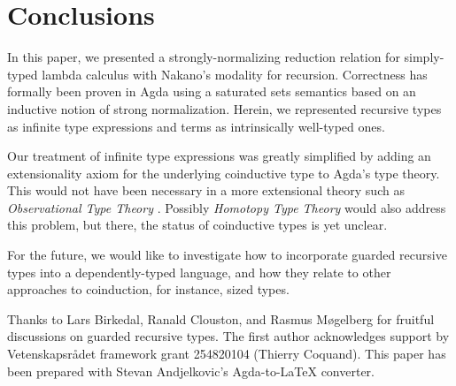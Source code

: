 
\section{Conclusions}
\label{sec:concl}

In this paper, we presented a strongly-normalizing reduction relation
for simply-typed lambda calculus with Nakano's modality for
recursion.  Correctness has formally been proven in Agda using a
saturated sets semantics based on an inductive notion of strong
normalization.  Herein, we represented recursive types as infinite
type expressions and terms as intrinsically well-typed ones.  

Our treatment of infinite type expressions was greatly simplified by
adding an extensionality axiom for the underlying coinductive type to
Agda's type theory.  This would not have been necessary in a more
extensional theory such as \emph{Observational Type Theory}
\citep{altenkirchMcBrideSwierstra:plpv07}.  Possibly \emph{Homotopy Type
Theory} \citep{hott} 
would also address this problem, but there, the status of
coinductive types is yet unclear.

For the future, we would like to investigate how to incorporate
guarded recursive types into a dependently-typed language, and how
they relate to other approaches to coinduction, for instance, sized
types.

Thanks to Lars Birkedal, Ranald Clouston, and Rasmus M\o{}gelberg for
fruitful discussions on guarded recursive types.
The first author acknowledges support by Vetenskapsr\aa{}det framework
grant 254820104 (Thierry Coquand).  This paper has been prepared with
Stevan Andjelkovic's Agda-to-LaTeX converter. 


